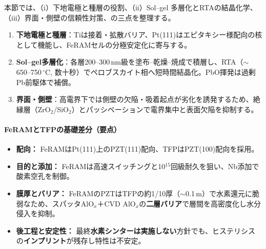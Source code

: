 \documentclass[conference]{IEEEtran}
\begin{document}
本節では、（i）下地電極と種層の役割、（ii）Sol--gel 多層化とRTAの結晶化学、（iii）界面・側壁の信頼性対策、の三点を整理する。
\begin{enumerate}
  \item \textbf{下地電極と種層}：Tiは接着・拡散バリア、Pt(111)はエピタキシー様配向の核として機能し、FeRAMセルの分極安定化に寄与する。
  \item \textbf{Sol--gel多層化}：各層200--300\,nm級を塗布–乾燥–焼成で積層し、RTA（$\sim$650--750\,$^\circ$C, 数十秒）でペロブスカイト相へ短時間結晶化。PbO揮発は過剰Pb前駆体で補償。
  \item \textbf{界面・側壁}：高電界下では側壁の欠陥・吸着起点が劣化を誘発するため、絶縁層（ZrO$_2$/SiO$_2$）とパッシベーションで電界集中と表面欠陥を抑制する。
\end{enumerate}

\paragraph{FeRAMとTFPの基礎差分（要点）}
\begin{itemize}
  \item \textbf{配向：} FeRAMはPt(111)上のPZT(111)配向、TFPはPZT(100)配向を採用。
  \item \textbf{目的と添加：} FeRAMは高速スイッチングと10$^{15}$回級耐久を狙い、Nb添加で酸素空孔を制御。
  \item \textbf{膜厚とバリア：} FeRAMのPZTはTFPの約1/10厚（$\sim$0.1\,\textmu m）で水素還元に脆弱なため、スパッタAlO$_x$＋CVD AlO$_x$の\textbf{二層バリア}で層間を高密度化し水分侵入を抑制。
  \item \textbf{後工程と安定性：} 最終\textbf{水素シンターは実施しない}方針でも、ヒステリシスの\textbf{インプリント}が残存し特性は不安定。
\end{itemize}
\end{document}
